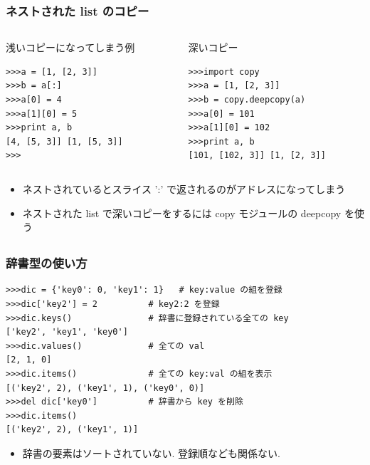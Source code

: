\begin{frame}[t,fragile]
\frametitle{ネストされた list のコピー}
\begin{columns}
\begin{column}{6cm}
浅いコピーになってしまう例
\begin{lstlisting}
>>>a = [1, [2, 3]]
>>>b = a[:]
>>>a[0] = 4
>>>a[1][0] = 5
>>>print a, b
[4, [5, 3]] [1, [5, 3]]
>>>
\end{lstlisting}
\end{column}

\begin{column}{6cm}
深いコピー
\begin{lstlisting}
>>>import copy
>>>a = [1, [2, 3]]
>>>b = copy.deepcopy(a)
>>>a[0] = 101
>>>a[1][0] = 102
>>>print a, b
[101, [102, 3]] [1, [2, 3]]
\end{lstlisting}
\end{column}
\end{columns}

\begin{itemize}
\item ネストされているとスライス ':' で返されるのがアドレスになってしまう
\item ネストされた list で深いコピーをするには copy モジュールの deepcopy を使う
\end{itemize}

\end{frame}

\subsection*{\redm\whiteb\greenb}

\begin{frame}[t,fragile]
\frametitle{辞書型の使い方}
\begin{lstlisting}
>>>dic = {'key0': 0, 'key1': 1}   # key:value の組を登録
>>>dic['key2'] = 2          # key2:2 を登録
>>>dic.keys()               # 辞書に登録されている全ての key
['key2', 'key1', 'key0']
>>>dic.values()             # 全ての val
[2, 1, 0]
>>>dic.items()              # 全ての key:val の組を表示
[('key2', 2), ('key1', 1), ('key0', 0)]  
>>>del dic['key0']          # 辞書から key を削除
>>>dic.items()
[('key2', 2), ('key1', 1)]
\end{lstlisting}

\begin{itemize}
\item 辞書の要素はソートされていない. 登録順なども関係ない. 
\end{itemize}
\end{frame}


